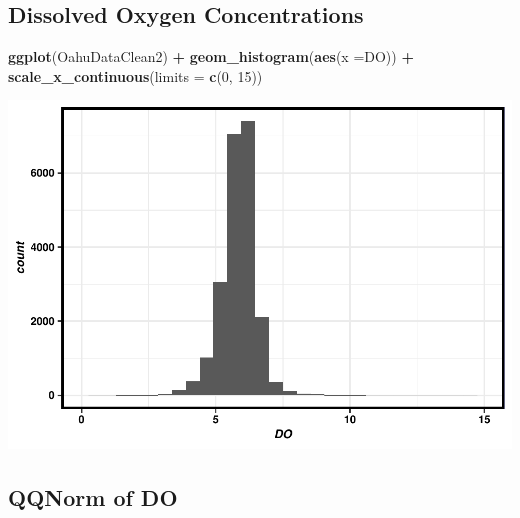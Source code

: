 \documentclass[12pt,]{article}
\newenvironment{Shaded}{\begin{snugshade}}{\end{snugshade}}
\newcommand{\KeywordTok}[1]{\textcolor[rgb]{0.13,0.29,0.53}{\textbf{#1}}}
\newcommand{\DataTypeTok}[1]{\textcolor[rgb]{0.13,0.29,0.53}{#1}}
\newcommand{\DecValTok}[1]{\textcolor[rgb]{0.00,0.00,0.81}{#1}}
\newcommand{\StringTok}[1]{\textcolor[rgb]{0.31,0.60,0.02}{#1}}
\newcommand{\OperatorTok}[1]{\textcolor[rgb]{0.81,0.36,0.00}{\textbf{#1}}}
\newcommand{\NormalTok}[1]{#1}
\begin{document}
\subsection{Dissolved Oxygen
Concentrations}\label{dissolved-oxygen-concentrations}

\begin{Shaded}
\begin{Highlighting}[]
\KeywordTok{ggplot}\NormalTok{(OahuDataClean2) }\OperatorTok{+}
\StringTok{  }\KeywordTok{geom_histogram}\NormalTok{(}\KeywordTok{aes}\NormalTok{(}\DataTypeTok{x =}\NormalTok{DO)) }\OperatorTok{+}
\KeywordTok{scale_x_continuous}\NormalTok{(}\DataTypeTok{limits =} \KeywordTok{c}\NormalTok{(}\DecValTok{0}\NormalTok{, }\DecValTok{15}\NormalTok{))}
\end{Highlighting}
\end{Shaded}

\includegraphics{Garcia_ENV872_Project_files/figure-latex/unnamed-chunk-32-1.pdf}

\subsection{QQNorm of DO}\label{qqnorm-of-do}

\begin{Shaded}
\end{Shaded}
\end{document}
